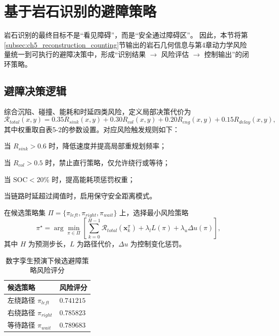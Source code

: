 \section{基于岩石识别的避障策略}
\label{sec:ch5_obstacle_avoidance}

岩石识别的最终目标不是“看见障碍”，而是“安全通过障碍区”。
因此，本节将第\ref{subsec:ch5_reconstruction_counting}节输出的岩石几何信息与第4章动力学风险量统一到可执行的避障决策中，形成“识别结果 $\rightarrow$ 风险评估 $\rightarrow$ 控制输出”的闭环策略。

\subsection{避障决策逻辑}
\label{subsec:ch5_decision_logic}

综合沉陷、碰撞、能耗和时延四类风险，定义局部决策代价为
\begin{equation}
\mathcal{R}_{total}(x,y)=0.35R_{sink}(x,y)+0.30R_{col}(x,y)+0.20R_{eng}(x,y)+0.15R_{delay}(x,y),
\label{eq:ch5_total_risk}
\end{equation}
其中权重取自表5-2的参数设置。对应风险触发规则如下：
\begin{myitemize}
	\item 当 $R_{sink}>0.6$ 时，降低速度并提高局部重规划频率；
	\item 当 $R_{col}>0.5$ 时，禁止直行策略，仅允许绕行或等待；
	\item 当 $\mathrm{SOC}<20\%$ 时，提高能耗项惩罚权重；
	\item 当链路时延超过阈值时，启用保守安全距离模式。
\end{myitemize}

在候选策略集 $\Pi=\{\pi_{left},\pi_{right},\pi_{wait}\}$ 上，选择最小风险策略
\begin{equation}
\pi^\star=\arg\min_{\pi\in\Pi}\left[\sum_{k=0}^{H-1}\mathcal{R}_{total}\!\left(\mathbf{x}_k^\pi\right)+\lambda_l L(\pi)+\lambda_u\Delta u(\pi)\right],
\label{eq:ch5_policy_select}
\end{equation}
其中 $H$ 为预测步长，$L$ 为路径代价，$\Delta u$ 为控制变化惩罚。

\begin{table}[H]
	\centering
	\small
	\caption{数字孪生预演下候选避障策略风险评分}
	\label{tab:ch5_candidate_policy_risk}
	\begin{tabular}{p{}p{}}
		\toprule
		候选策略 & 风险评分 \\
		\midrule
		左绕路径 $\pi_{left}$ & $0.741215$ \\
		右绕路径 $\pi_{right}$ & $0.785823$ \\
		等待路径 $\pi_{wait}$ & $0.789683$ \\
		\bottomrule
	\end{tabular}
\end{table}

